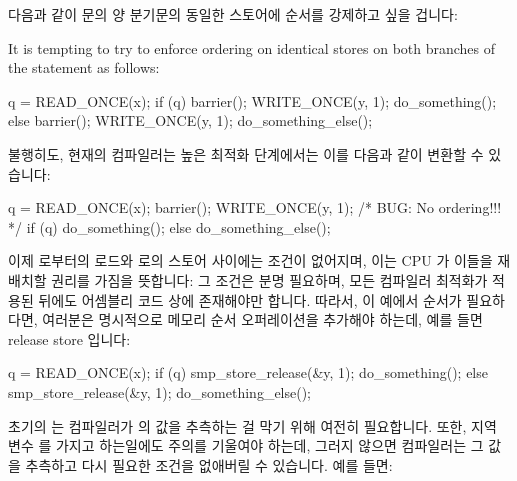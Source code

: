 다음과 같이  문의 양 분기문의 동일한 스토어에 순서를 강제하고 싶을
겁니다:

It is tempting to try to enforce ordering on identical stores on both
branches of the  statement as follows:

\begin{VerbatimN}
q = READ_ONCE(x);
if (q) {
	barrier();
	WRITE_ONCE(y, 1);
	do_something();
} else {
	barrier();
	WRITE_ONCE(y, 1);
	do_something_else();
}
\end{VerbatimN}

불행히도, 현재의 컴파일러는 높은 최적화 단계에서는 이를 다음과 같이 변환할 수
있습니다:

\begin{VerbatimN}
q = READ_ONCE(x);
barrier();
WRITE_ONCE(y, 1);  /* BUG: No ordering!!! */
if (q)
	do_something();
else
	do_something_else();
\end{VerbatimN}

이제  로부터의 로드와  로의 스토어 사이에는 조건이 없어지며, 이는
CPU 가 이들을 재배치할 권리를 가짐을 뜻합니다:
그 조건은 분명 필요하며, 모든 컴파일러 최적화가 적용된 뒤에도 어셈블리 코드
상에 존재해야만 합니다.
따라서, 이 예에서 순서가 필요하다면, 여러분은 명시적으로 메모리 순서
오퍼레이션을 추가해야 하는데, 예를 들면 release store 입니다:

\begin{VerbatimN}
q = READ_ONCE(x);
if (q) {
	smp_store_release(&y, 1);
	do_something();
} else {
	smp_store_release(&y, 1);
	do_something_else();
}
\end{VerbatimN}

초기의  는 컴파일러가  의 값을 추측하는 걸 막기 위해
여전히 필요합니다.
또한, 지역 변수  를 가지고 하는일에도 주의를 기울여야 하는데, 그러지
않으면 컴파일러는 그 값을 추측하고 다시 필요한 조건을 없애버릴 수 있습니다.
예를 들면:

